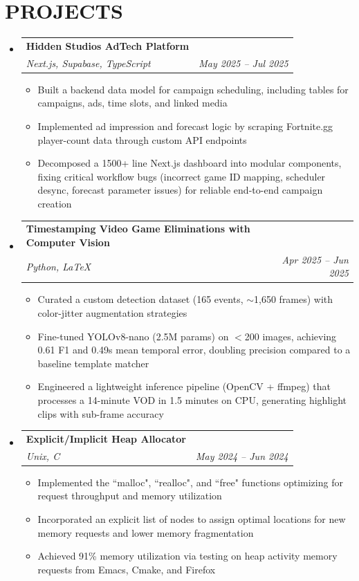 \documentclass[letterpaper,11pt]{article}
\makeatletter
\newcommand{\resumeItem}[1]{
  \item\small{
    {#1 \vspace{-4pt}}
  }
}
\newcommand{\resumeSubheading}[4]{
  \vspace{-2pt}\item
    \begin{tabular*}{0.97\textwidth}[t]{l@{\extracolsep{\fill}}r}
      \vspace{-2pt}
      \textbf{\fontsize{11.5}{11.5}\selectfont #1} & \small#2 \\
      \textit{\small#3} & \textit{\small #4} \\
    \end{tabular*}\vspace{-10pt}
}
\newcommand{\resumeSubHeadingListStart}{\begin{itemize}[leftmargin=0in, label={}]}
\newcommand{\resumeSubHeadingListEnd}{\end{itemize}}
\newcommand{\resumeItemListStart}{\begin{itemize}[leftmargin=0.2in]}
\newcommand{\resumeItemListEnd}{\end{itemize}\vspace{-5pt}}
\makeatother
\begin{document}
  \section{\textbf{PROJECTS}}
  \resumeSubHeadingListStart
    \resumeSubheading
    {Hidden Studios AdTech Platform}{}
    {Next.js, Supabase, TypeScript}{May 2025 -- Jul 2025}
    \vspace{1pt}
    \resumeItemListStart
        \resumeItem{Built a backend data model for campaign scheduling, including tables for campaigns, ads, time slots, and linked media}
        \resumeItem{Implemented ad impression and forecast logic by scraping Fortnite.gg player-count data through custom API endpoints}
        \resumeItem{Decomposed a 1500+ line Next.js dashboard into modular components, fixing critical workflow bugs (incorrect game ID mapping, scheduler desync, forecast parameter issues) for reliable end-to-end campaign creation}
    \resumeItemListEnd

    \resumeSubheading
    {Timestamping Video Game Eliminations with Computer Vision}{}
    {Python, LaTeX}{Apr 2025 -- Jun 2025}
    \vspace{1pt}
    \resumeItemListStart
        \resumeItem{Curated a custom detection dataset (165 events, $\sim$1,650 frames) with color-jitter augmentation strategies}
        \resumeItem{Fine-tuned YOLOv8-nano (2.5M params) on $<$200 images, achieving 0.61 F1 and 0.49s mean temporal error, doubling precision compared to a baseline template matcher}
        \resumeItem{Engineered a lightweight inference pipeline (OpenCV + ffmpeg) that processes a 14-minute VOD in 1.5 minutes on CPU, generating highlight clips with sub-frame accuracy}
    \resumeItemListEnd 

    \resumeSubheading
    {Explicit/Implicit Heap Allocator}{}
    {Unix, C}{May 2024 -- Jun 2024}
    \vspace{1pt}
    \resumeItemListStart
        \resumeItem{Implemented the “malloc", “realloc", and “free" functions optimizing for request throughput and memory utilization}
        \resumeItem{Incorporated an explicit list of nodes to assign optimal locations for new memory requests and lower memory fragmentation}
        \resumeItem{Achieved 91\% memory utilization via testing on heap activity memory requests from Emacs, Cmake, and Firefox}
    \resumeItemListEnd

      \resumeSubHeadingListEnd
\end{document}
